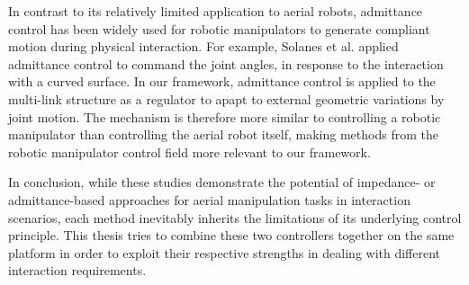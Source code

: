 In contrast to its relatively limited application to aerial robots, admittance control has been widely used for robotic manipulators to generate compliant motion during physical interaction. For example, Solanes et al. \cite{solanes_2018_adaptive} applied admittance control to command the joint angles, in response to the interaction with a curved surface. In our framework, admittance control is applied to the multi-link structure as a regulator to apapt to external geometric variations by joint motion. The mechanism is therefore more similar to controlling a robotic manipulator than controlling the aerial robot itself, making methods from the robotic manipulator control field more relevant to our framework.

In conclusion, while these studies demonstrate the potential of impedance- or admittance-based approaches for aerial manipulation tasks in interaction scenarios, each method inevitably inherits the limitations of its underlying control principle.
This thesis tries to combine these two controllers together on the same platform in order to exploit their respective strengths in dealing with different interaction requirements.





